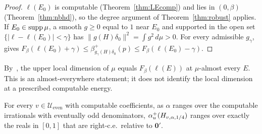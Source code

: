 \begin{proof}
$\ell(E_0)$ is computable (Theorem~\ref{thm:LEcomp}) and lies in $(0,\beta)$ (Theorem~\ref{thm:nbhd}), so the degree argument of Theorem~\ref{thm:robust} applies. If $E_0\in\operatorname{supp}\mu$, a smooth $g\ge0$ equal to $1$ near $E_0$ and supported in the open set $\{|\ell-\ell(E_0)|<\gamma\}$ has $\|g(H)\delta_0\|^2=\int g^2\,d\mu>0$. For every admissible $g_\gamma$, \cite[Theorem~B(2)]{DMuniv} gives $F_\beta(\ell(E_0)+\gamma)\le\beta^+_{g_\gamma(H)\delta_0}(p)\le F_\beta(\ell(E_0)-\gamma)$.
\end{proof}

By~\cite[Theorem~B(3)]{DMuniv}, the upper local dimension of $\mu$ equals $F_\beta(\ell(E))$ at $\mu$-almost every $E$. This is an almost-everywhere statement; it does not identify the local dimension at a prescribed computable energy.

\begin{theorem}\label{thm:values}
For every $v\in\mathcal U_{\mathrm{even}}$ with computable coefficients, as $\alpha$ ranges over the computable irrationals with eventually odd denominators, $\alpha_u^+(H_{v,\alpha,1/4})$ ranges over exactly the reals in $[0,1]$ that are right-c.e.\ relative to $\mathbf 0'$.
\end{theorem}

